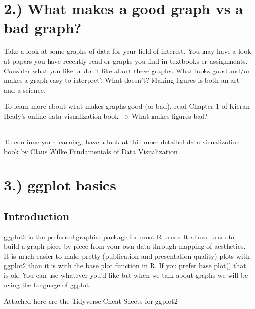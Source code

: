 \documentclass[
  letterpaper,
  DIV=11,
  numbers=noendperiod]{scrartcl}
\begin{document}
\hypertarget{what-makes-a-good-graph-vs-a-bad-graph}{%
\section{\texorpdfstring{\textbf{2.) What makes a good graph vs a bad
graph?}}{2.) What makes a good graph vs a bad graph?}}\label{what-makes-a-good-graph-vs-a-bad-graph}}

Take a look at some graphs of data for your field of interest. You may
have a look at papers you have recently read or graphs you find in
textbooks or assignments. Consider what you like or don't like about
these graphs. What looks good and/or makes a graph easy to interpret?
What doesn't? Making figures is both an art and a science.

To learn more about what makes graphs good (or bad), read Chapter 1 of
Kieran Healy's online data visualization book --\textgreater{}
\href{https://socviz.co/lookatdata.html\#lookatdata}{What makes figures
bad?}\\
\strut \\
To continue your learning, have a look at this more detailed data
visualization book by Claus Wilke
\href{https://clauswilke.com/dataviz/index.html}{Fundamentals of Data
Visualization}\\

\hypertarget{ggplot-basics}{%
\section{\texorpdfstring{\textbf{3.) ggplot
basics}}{3.) ggplot basics}}\label{ggplot-basics}}

\subsection{\texorpdfstring{\textbf{Introduction}}{Introduction}}

ggplot2 is the preferred graphics package for most R users. It allows
users to build a graph piece by piece from your own data through mapping
of aesthetics. It is much easier to make pretty (publication and
presentation quality) plots with ggplot2 than it is with the base plot
function in R. If you prefer base plot() that is ok. You can use
whatever you'd like but when we talk about graphs we will be using the
language of ggplot.

Attached here are the Tidyverse Cheat Sheets for ggplot2
\end{document}
